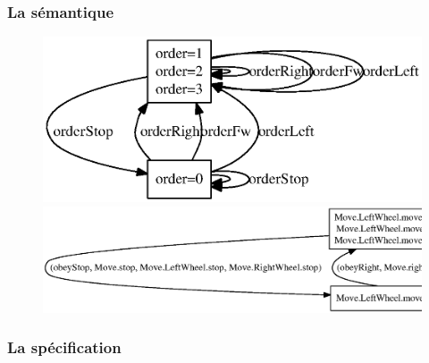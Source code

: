    \subsubsection{La sémantique}
   \begin{figure}[!ht]
    \begin{center}
     \includegraphics{../src/altarica/BTMaster.eps}
     \includegraphics{../src/altarica/BTSlave.eps}
    \end{center}
   \end{figure}

\subsubsection{La spécification}
   
  
